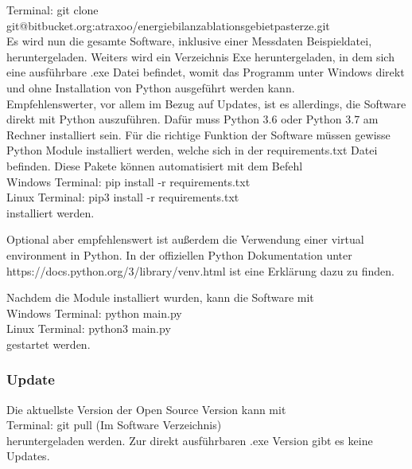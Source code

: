 \documentclass[11pt,a4paper]{article}
\begin{document}
Terminal: \textsf{\small git clone git@bitbucket.org:atraxoo/energiebilanzablationsgebietpasterze.git}\\


Es wird nun die gesamte Software, inklusive einer Messdaten Beispieldatei, heruntergeladen. Weiters wird ein Verzeichnis Exe heruntergeladen, in dem sich eine ausführbare .exe Datei befindet, womit das Programm unter Windows direkt und ohne Installation von Python ausgeführt werden kann.\\

Empfehlenswerter, vor allem im Bezug auf Updates, ist es allerdings, die Software direkt mit Python auszuführen. Dafür muss Python 3.6 oder Python 3.7 am Rechner installiert sein. Für die richtige Funktion der Software müssen gewisse Python Module installiert werden, welche sich in der requirements.txt Datei befinden. Diese Pakete können automatisiert mit dem Befehl\\

Windows Terminal: \textsf{\small pip install -r requirements.txt}\\
Linux Terminal:  \textsf{\small pip3 install -r requirements.txt}\\

installiert werden.

Optional aber empfehlenswert ist außerdem die Verwendung einer virtual environment in Python. In der offiziellen Python Dokumentation unter \textsf{\small https://docs.python.org/3/library/venv.html} ist eine Erklärung dazu zu finden.

Nachdem die Module installiert wurden, kann die Software mit \\

Windows Terminal: \textsf{\small python main.py}\\
Linux Terminal: \textsf{\small python3 main.py}\\

gestartet werden.

\subsubsection{Update}
Die aktuellste Version der Open Source Version kann mit \\

Terminal: \textsf{\small git pull} (Im Software Verzeichnis)\\

heruntergeladen werden. Zur direkt ausführbaren .exe Version gibt es keine Updates.
\end{document}
